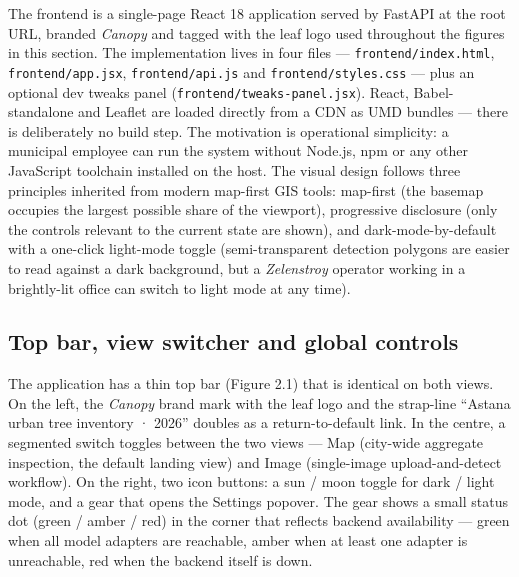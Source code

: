 The frontend is a single-page React 18 application served by FastAPI at the root URL, branded \emph{Canopy} and tagged with the leaf logo used throughout the figures in this section. The implementation lives in four files --- \texttt{frontend/index.html}, \texttt{frontend/app.jsx}, \texttt{frontend/api.js} and \texttt{frontend/styles.css} --- plus an optional dev tweaks panel (\texttt{frontend/tweaks-panel.jsx}). React, Babel-standalone and Leaflet are loaded directly from a CDN as UMD bundles --- there is deliberately no build step. The motivation is operational simplicity: a municipal employee can run the system without Node.js, npm or any other JavaScript toolchain installed on the host. The visual design follows three principles inherited from modern map-first GIS tools: map-first (the basemap occupies the largest possible share of the viewport), progressive disclosure (only the controls relevant to the current state are shown), and dark-mode-by-default with a one-click light-mode toggle (semi-transparent detection polygons are easier to read against a dark background, but a \emph{Zelenstroy} operator working in a brightly-lit office can switch to light mode at any time).

\subsection{Top bar, view switcher and global controls}\label{top-bar-view-switcher-and-global-controls}

The application has a thin top bar (Figure 2.1) that is identical on both views. On the left, the \emph{Canopy} brand mark with the leaf logo and the strap-line ``Astana urban tree inventory · 2026'' doubles as a return-to-default link. In the centre, a segmented switch toggles between the two views --- Map (city-wide aggregate inspection, the default landing view) and Image (single-image upload-and-detect workflow). On the right, two icon buttons: a sun / moon toggle for dark / light mode, and a gear that opens the Settings popover. The gear shows a small status dot (green / amber / red) in the corner that reflects backend availability --- green when all model adapters are reachable, amber when at least one adapter is unreachable, red when the backend itself is down.

